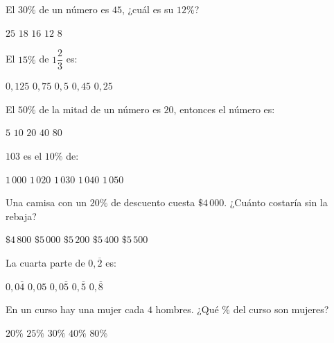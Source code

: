 \documentclass[]{srs}
\begin{document}
\begin{preguntas}



\pregunta El $30\%$ de un número es $45$, ¿cuál es su $12\%$?
\begin{vertical}
\alternativa $25$
\alternativa $18$
\alternativa $16$
\alternativa $12$
\alternativa $8$
\end{vertical}

\pregunta El $15\%$ de $1\dfrac{2}{3}$ es:
\begin{vertical}
\alternativa $0,125$
\alternativa $0,75$
\alternativa $0,5$
\alternativa $0,45$
\alternativa $0,25$
\end{vertical}


\pregunta El $50\%$ de la mitad de un número es $20$, entonces el número es:
\begin{vertical}
\alternativa $5$
\alternativa $10$
\alternativa $20$
\alternativa $40$
\alternativa $80$
\end{vertical}

\pregunta $103$ es el $10\%$ de:
\begin{vertical}
\alternativa $1\,000$
\alternativa $1\,020$
\alternativa $1\,030$
\alternativa $1\,040$
\alternativa $1\,050$
\end{vertical}


\pregunta Una camisa con un $20\%$ de descuento cuesta $\$4\,000$. ¿Cuánto costaría sin la rebaja?
\begin{vertical}
\alternativa $\$4\,800$
\alternativa $\$5\,000$
\alternativa $\$5\,200$
\alternativa $\$5\,400$
\alternativa $\$5\,500$
\end{vertical}

\pregunta La cuarta parte de $0,\overline{2}$ es:
\begin{vertical}
\alternativa $0,0\overline{4}$
\alternativa $0,05$
\alternativa $0,0\overline{5}$
\alternativa $0,\overline{5}$
\alternativa $0,\overline{8}$
\end{vertical}

\pregunta En un curso hay una mujer cada $4$ hombres. ¿Qué $\%$ del curso son mujeres?
\begin{vertical}
\alternativa $20\%$
\alternativa $25\%$
\alternativa $30\%$
\alternativa $40\%$
\alternativa $80\%$
\end{vertical}


\end{preguntas}
\end{document}
